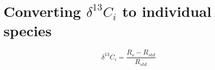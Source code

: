 \documentclass[]{article}
\begin{document}
\section{\texorpdfstring{Converting \(\delta ^{13}C_{i}\) to individual
species}{Converting \textbackslash{}delta \^{}\{13\}C\_\{i\} to individual species}}\label{converting-delta-13c_i-to-individual-species}

\[
\delta ^{13}C_{i} = \frac{R_s - R_{std}}{R_{std}}
\]


\end{document}
